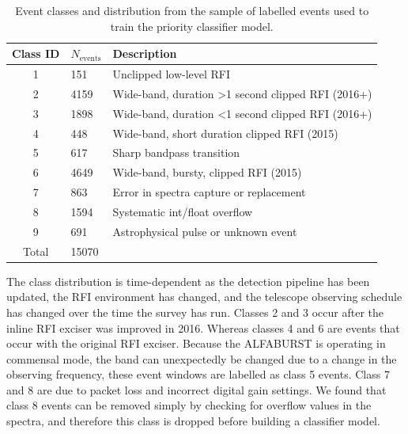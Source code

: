 \documentclass[a4paper,fleqn,usenatbib]{mnras}
\begin{document}
\begin{table}
\centering
\begin{tabularx}{\linewidth}{clX}
\hline
Class ID & $N_{\textrm{events}}$ & Description                                     \\
\hline
1        & 151     & Unclipped low-level RFI                                       \\
2        & 4159    & Wide-band, duration \textgreater 1 second clipped RFI (2016+) \\
3        & 1898    & Wide-band, duration \textless 1 second clipped RFI (2016+)    \\
4        & 448     & Wide-band, short duration clipped RFI (2015)                  \\
5        & 617     & Sharp bandpass transition                                     \\
6        & 4649    & Wide-band, bursty, clipped RFI (2015)                         \\
7        & 863     & Error in spectra capture or replacement                       \\
8        & 1594    & Systematic int/float overflow                                 \\
9        & 691     & Astrophysical pulse or unknown event                          \\
\hline
Total    & 15070   &                                                              
\end{tabularx}
\caption{Event classes and distribution from the sample of labelled events used
to train the priority classifier model.}
\label{tbl:event_classes}
\end{table}

The class distribution is time-dependent as the detection pipeline has been
updated, the RFI environment has changed, and the telescope observing schedule
has changed over the time the survey has run. Classes 2 and 3 occur after the
inline RFI exciser was improved in 2016. Whereas classes 4 and 6 are events that
occur with the original RFI exciser. Because the ALFABURST is operating in
commensal mode, the band can unexpectedly be changed due to a change in the
observing frequency, these event windows are labelled as class 5 events. Class 7
and 8 are due to packet loss and incorrect digital gain settings. We found that
class 8 events can be removed simply by checking for overflow values in the
spectra, and therefore this class is dropped before building a classifier model.
\end{document}
